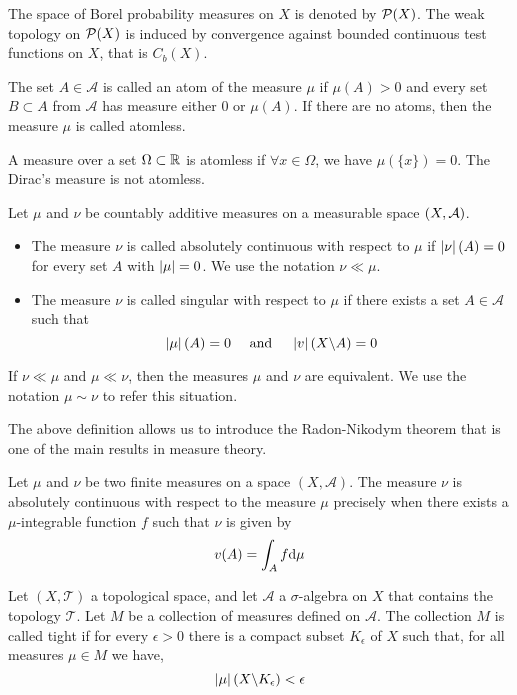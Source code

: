 The space of Borel probability measures on $X$ is denoted by $\mathcal{P}(X)$. The weak topology on $\mathcal{P}(X)$ is induced by convergence against bounded continuous test functions on $X$, that is $C_b(X)$.

\begin{definition}
	The set $A \in \mathcal A$ is called an atom of the measure $\mu$
	if $\mu(A) > 0$ and every set $B \subset A$ from $\mathcal A$ has measure either $0$ or $\mu(A)$. If there are no atoms, then the measure $\mu$ is called atomless. 
\end{definition}

A measure over a set $\Omega\subset \mathbb{R}$ is atomless if $\forall x \in \Omega$, we have  $\mu(\{x\})=0$. The Dirac's measure is not atomless. 
\begin{definition}
	Let $\mu$ and $\nu$ be countably additive measures on a measurable space $\left( X, \mathcal A \right)$. 
	\begin{itemize}
		\item The measure $\nu$ is called absolutely continuous with respect to $\mu$ if $\left| \nu \right|(A)=0$ for every set $A$ with $\left| \mu \right|=0$. We use the notation $\nu \ll \mu$.
		\item The measure $\nu$ is called singular with respect to $\mu$ if there exists a set $A\in \mathcal{A}$ such that
		\begin{equation*}
			\left| \mu \right|(A)=0 \quad \text{ and }\quad  \left| v \right|(X\backslash A)=0
		\end{equation*}
	\end{itemize}
	
	If $\nu \ll \mu $ and $\mu \ll \nu$, then the measures $\mu$ and $\nu$ are equivalent. We use the notation $\mu \sim \nu$ to refer this situation.
\end{definition}
The above definition allows us to introduce the Radon-Nikodym theorem that is one of the main results in measure theory.
\begin{theorem}
	Let $\mu$ and $\nu$ be two finite measures on a space $(X, \mathcal A)$.
	The measure $\nu$ is absolutely continuous with respect to the measure $\mu$ precisely	when there exists a $\mu$-integrable function $f$ such that $\nu$ is given by
	\begin{equation*}
		v(A)=\int_A f\mathrm{d}\mu
	\end{equation*}
\end{theorem}
\begin{definition}[Tightness] Let $(X, \mathcal T)$ a topological space, and let $\mathcal A$ a $\sigma$-algebra on $X$ that contains the topology $\mathcal{T}$. Let $M$ be a collection of measures defined on $\mathcal{A}$. The collection $M$ is called tight  if for every $\epsilon>0$ there is a compact subset $K_\epsilon$ of $X$ such that, for all measures $\mu\in M$ we have,
	\begin{equation*}
	\left| \mu \right|\left( X \backslash K_\epsilon \right) < \epsilon
	\end{equation*} 
\end{definition}

